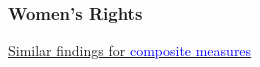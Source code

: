 \documentclass[9pt,letterpaper,subeqn]{beamer}
\begin{document}


\begin{frame}[label=Rights]
\frametitle{Women's Rights}

\hyperlink{RightsComp}{Similar findings for \textcolor{blue}{composite measures}}
\end{frame}




\end{document}
